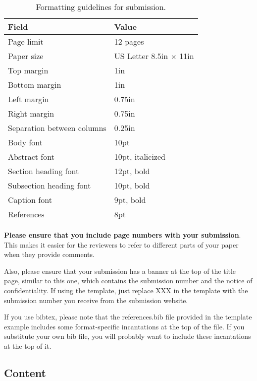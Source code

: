 \documentclass[pageno]{jpaper}
\begin{document}
\begin{table}[h!]
  \centering
  \begin{tabular}{|l|l|}
    \hline
    \textbf{Field} & \textbf{Value}\\
    \hline
    \hline
    Page limit & 12 pages\\
    \hline
    Paper size & US Letter 8.5in $\times$ 11in\\
    \hline
    Top margin & 1in\\
    \hline
    Bottom margin & 1in\\
    \hline
    Left margin & 0.75in\\
    \hline
    Right margin & 0.75in\\
    \hline
    Separation between columns & 0.25in\\
    \hline
    Body font & 10pt\\
    \hline
    Abstract font & 10pt, italicized\\
    \hline
    Section heading font & 12pt, bold\\
    \hline
    Subsection heading font & 10pt, bold\\
    \hline
    Caption font & 9pt, bold\\
    \hline
    References & 8pt\\
    \hline
  \end{tabular}
  \caption{Formatting guidelines for submission. }
  \label{table:formatting}
\end{table}

\textbf{Please ensure that you include page numbers with your
submission}. This makes it easier for the reviewers to refer to
different parts of your paper when they provide comments.

Also, please ensure that your submission has a banner at the top of 
the title page, similar to this one, which contains the submission
number and the notice of confidentiality.  If using the template,
just replace XXX in the template with the submission number
you receive from the submission website.

If you use bibtex, please note that the references.bib file provided in the template example includes some format-specific incantations at the top of the file.  If you substitute your own bib file, you will probably want to include these 
incantations at the top of it.

\subsection{Content}
\end{document}
